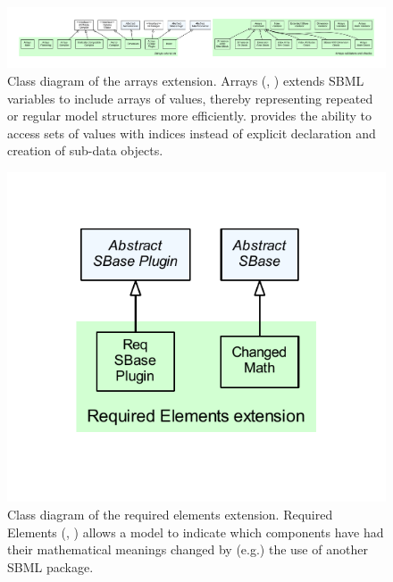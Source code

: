 \begin{figure}[hb]
 \centering
 \vspace*{2ex}
 \includegraphics[width=\textwidth]{../../../extensions/arrays/doc/img/type_hierarchy.pdf}
 \caption[Class diagram of the arrays extension]{Class diagram of the arrays extension. Arrays (, \cite{Watanabe2013}) extends SBML variables to include arrays of values,
thereby representing repeated or regular model structures more efficiently.
 provides the ability to access sets of values with indices instead of explicit
declaration and creation of sub-data objects.}
 \label{fig:arrays}
\end{figure}


\begin{figure}[hb]
 \centering
 \vspace*{2ex}
 \includegraphics[width=.5\textwidth]{../../../extensions/req/doc/img/type_hierarchy.pdf}
 \caption[Class diagram of the required elements extension]{Class diagram of the required elements extension. Required Elements (, \cite{Smith2013}) allows a model to indicate which
components have had their mathematical meanings changed by (e.g.) the use of
another SBML package.}
 \label{fig:arrays}
\end{figure}


